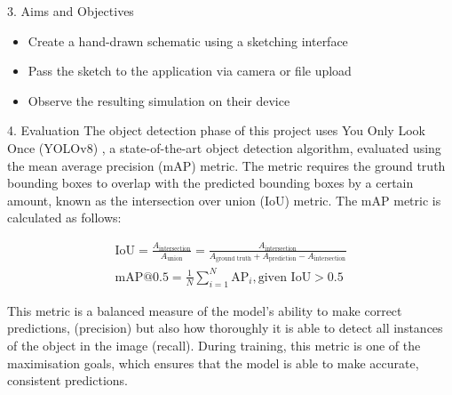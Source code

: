 \documentclass{beamer}
\begin{document}
\begin{frame}[t]
\begin{columns}[t]
\begin{column}{\colwidth}
\begin{block}{3. Aims and Objectives}
        \begin{itemize}
          \item Create a hand-drawn schematic using a sketching interface
          \item Pass the sketch to the application via camera or file upload
          \item Observe the resulting simulation on their device
        \end{itemize}
      \end{block}

      {
      \begin{block}{4. Evaluation}
        The object detection phase of this project uses You Only Look Once (YOLOv8) \cite{dl/ultralytics},
        a state-of-the-art object detection algorithm, evaluated using the mean average
        precision (mAP) metric. The metric requires the ground truth bounding boxes to
        overlap with the predicted bounding boxes by a certain amount, known as the
        intersection over union (IoU) metric. The mAP metric is calculated as follows:

        $$
          \begin{aligned}
            \text{IoU} = \frac{A_{\text{intersection}}}{A_{\text{union}}} = \frac{A_{\text{intersection}}}{A_{\text{ground truth}} + A_{\text{prediction}} - A_{\text{intersection}}}
            \\[2ex]
            \text{mAP@0.5} = \frac{1}{N} \sum_{i=1}^{N} \text{AP}_i, \text{given IoU} > 0.5
          \end{aligned}
        $$

        This metric is a balanced measure of the model's ability to make correct predictions, (precision)
        but also how thoroughly it is able to detect all instances of the object in the image (recall).
        During training, this metric is one of the maximisation goals, which ensures that the
        model is able to make accurate, consistent predictions.
      \end{block}
      }




\end{column}
\end{columns}
\end{frame}
\end{document}
